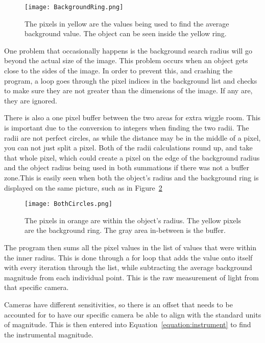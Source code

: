 \begin{figure}[ht!]
	\centering
	\texttt{[image: BackgroundRing.png]}
	\caption{The pixels in yellow are the values being used to find the average background value. The object can be seen inside the yellow ring.}
	\label{fig:background}
\end{figure}

One problem that occasionally happens is the background search radius will go beyond the actual size of the image. This problem occurs when an object gets close to the sides of the image. In order to prevent this, and crashing the program, a loop goes through the pixel indices in the background list and checks to make sure they are not greater than the dimensions of the image. If any are, they are ignored. 

There is also a one pixel buffer between the two areas for extra wiggle room. This is important due to the conversion to integers when finding the two radii. The radii are not perfect circles, as while the distance may be in the middle of a pixel, you can not just split a pixel. Both of the radii calculations round up, and take that whole pixel, which could create a pixel on the edge of the background radius and the object radius being used in both summations if there was not a buffer zone.This is easily seen when both the object's radius and the background ring is displayed on the same picture, such as in Figure~\ref{fig:BothCircles} 

\begin{figure}[ht!]
	\centering
	\texttt{[image: BothCircles.png]}
	\caption{The pixels in orange are within the object's radius. The yellow pixels are the background ring. The gray area in-between is the buffer.}
	\label{fig:BothCircles}
\end{figure}

The program then sums all the pixel values in the list of values that were within the inner radius. This is done through a for loop that adds the value onto itself with every iteration through the list, while subtracting the average background magnitude from each individual point. This is the raw measurement of light from that specific camera.

Cameras have different sensitivities, so there is an offset that needs to be accounted for to have our specific camera be able to align with the standard units of magnitude.   This is then entered into Equation~\ref{equation:instrument} to find the instrumental magnitude. 

